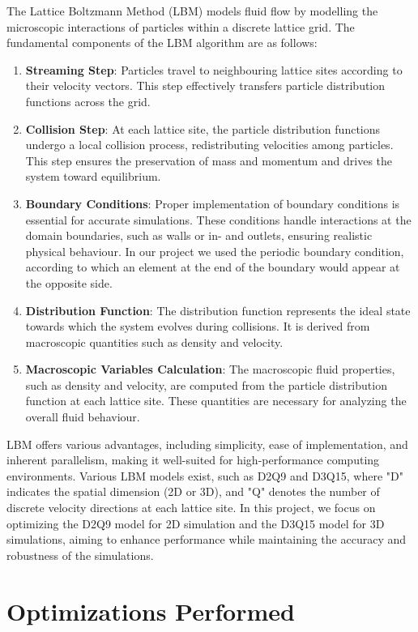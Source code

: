\documentclass[letterpaper]{article}
\begin{document}
The Lattice Boltzmann Method (LBM) models fluid flow by modelling the microscopic interactions of particles within a discrete lattice grid. The fundamental components of the LBM algorithm are as follows: 
\begin{enumerate} 
\item \textbf{Streaming Step}: Particles travel to neighbouring lattice sites according to their velocity vectors. This step effectively transfers particle distribution functions across the grid. 
\item \textbf{Collision Step}: At each lattice site, the particle distribution functions undergo a local collision process, redistributing velocities among particles.  This step ensures the preservation of mass and momentum and drives the system toward equilibrium. 
\item \textbf{Boundary Conditions}:  Proper implementation of boundary conditions is essential for accurate simulations. These conditions handle interactions at the domain boundaries, such as walls or in- and outlets, ensuring realistic physical behaviour. In our project we used the periodic boundary condition, according to which an element at the end of the boundary would appear at the opposite side. 
\item \textbf{Distribution Function}: The distribution function represents the ideal state towards which the system evolves during collisions.  It is derived from macroscopic quantities such as density and velocity. 
\item \textbf{Macroscopic Variables Calculation}: The macroscopic fluid properties, such as density and velocity, are computed from the particle distribution function at each lattice site. These quantities are necessary for analyzing the overall fluid behaviour. 
\end{enumerate} 
LBM offers various advantages,  including simplicity, ease of implementation, and inherent parallelism, making it well-suited for high-performance computing environments. Various LBM models exist, such as  D2Q9 and  D3Q15, where "D" indicates the spatial dimension (2D or 3D), and "Q" denotes the number of discrete velocity directions at each lattice site. In this project, we focus on optimizing the D2Q9 model for 2D simulation and the  D3Q15 model for 3D simulations, aiming to enhance performance while maintaining the accuracy and robustness of the simulations.  

\section{Optimizations Performed}
\end{document}
